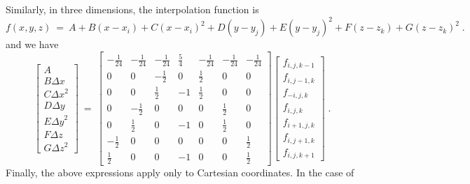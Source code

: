 Similarly, in three dimensions, the interpolation function is
\begin{equation}
f\left(x,y,z\right) \: = \: A + B \left(x - x_i\right) + C \left(x - x_i\right)^2
+ D \left(y - y_j\right) + E \left(y - y_j\right)^2 +
F \left(z - z_k\right) + G  \left(z - z_k\right)^2 \; .
\end{equation}
and we have
\begin{equation}
\left[ \begin{array}{c}
A \\ B \Delta x \\ C {\Delta x}^2 \\
D \Delta y \\ E {\Delta y}^2 \\ F \Delta z \\ G {\Delta z}^2
\end{array} \right]
\: = \:
\left[ \begin{array}{ccccccc}
-\frac{1}{24} & -\frac{1}{24} & -\frac{1}{24} & \frac{5}{4} & -\frac{1}{24} & -\frac{1}{24} & -\frac{1}{24} \\
0             & 0             & -\frac{1}{2}  & 0           &  \frac{1}{2}  & 0             &  0   \\
0             & 0             &  \frac{1}{2}  & -1          &  \frac{1}{2}  & 0             &  0   \\
0             & -\frac{1}{2}  &  0            &  0          &  0            & \frac{1}{2}   &  0   \\
0             &  \frac{1}{2}  &  0            & -1          &  0            & \frac{1}{2}   &  0   \\
-\frac{1}{2}  & 0             &  0            &  0          &  0            & 0             &  \frac{1}{2}   \\
 \frac{1}{2}  & 0             &  0            & -1          &  0            & 0             &  \frac{1}{2}
\end{array} \right]
\left[ \begin{array}{c}
f_{i,j,k-1} \\ f_{i,j-1,k} \\ f_{-i,j,k} \\
f_{i,j,k} \\ f_{i+1,j,k} \\ f_{i,j+1,k} \\ f_{i,j,k+1}
\end{array} \right]  \; .
\end{equation}
Finally, the above expressions apply only to Cartesian coordinates. In the case of
